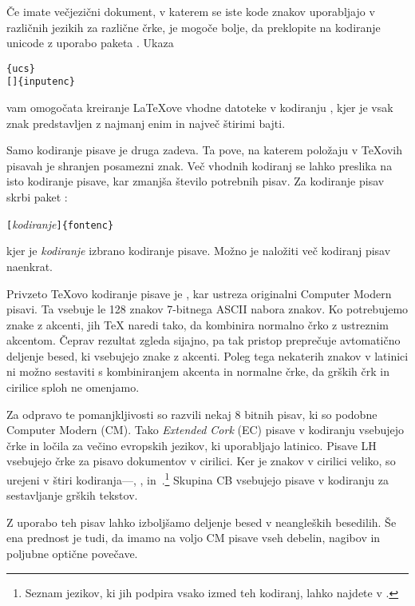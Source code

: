 Če imate večjezični dokument, v katerem se iste kode znakov uporabljajo
v različnih jezikih za različne črke, je mogoče bolje, da preklopite na kodiranje
unicode z uporabo paketa . Ukaza

\begin{lscommand}
\verb|{ucs}|\\ 
\verb|[|\verb|]{inputenc}| 
\end{lscommand}
\noindent vam omogočata kreiranje \LaTeX{}ove vhodne datoteke v kodiranju
, kjer je vsak znak predstavljen z najmanj enim in največ štirimi
bajti. 

Samo kodiranje pisave je druga zadeva. Ta pove, na katerem položaju v 
\TeX{}ovih pisavah je shranjen posamezni znak. Več vhodnih kodiranj se
lahko preslika na isto kodiranje pisave, kar zmanjša število potrebnih 
pisav. Za kodiranje pisav skrbi paket : \label{fontenc}
\begin{lscommand}
\verb|[|\emph{kodiranje}\verb|]{fontenc}| 
\end{lscommand}
\noindent kjer je \emph{kodiranje} izbrano kodiranje pisave. 
Možno je naložiti več kodiranj pisav naenkrat.

Privzeto \TeX{}ovo kodiranje pisave je \label{OT1} , 
kar ustreza originalni Computer Modern pisavi. Ta
 vsebuje le 128 znakov 7-bitnega ASCII nabora znakov. 
Ko potrebujemo znake z akcenti, jih \TeX{} naredi tako, da kombinira normalno črko z ustreznim 
akcentom. Čeprav rezultat zgleda sijajno, pa tak pristop preprečuje avtomatično deljenje besed,
ki vsebujejo znake z akcenti. Poleg tega nekaterih znakov v latinici ni možno
sestaviti s kombiniranjem akcenta in normalne črke, da grških črk in cirilice sploh ne omenjamo.

Za odpravo te pomanjkljivosti so razvili 
nekaj 8 bitnih pisav, ki so podobne Computer Modern (CM). Tako
\emph{Extended Cork} (EC) pisave v  kodiranju vsebujejo 
črke in ločila za večino evropskih jezikov, ki uporabljajo latinico.
Pisave LH vsebujejo črke za pisavo dokumentov v cirilici. 
Ker je znakov v cirilici veliko, so urejeni v štiri kodiranja---, , 
in~.\footnote{Seznam jezikov, ki jih podpira vsako izmed teh
kodiranj, lahko najdete v \cite{cyrguide}.} Skupina CB vsebujejo 
pisave v  kodiranju za sestavljanje grških tekstov.

Z uporabo teh pisav lahko izboljšamo deljenje besed v neangleških besedilih. 
Še ena prednost je tudi, da imamo na voljo CM pisave vseh debelin,
nagibov in poljubne optične povečave. 

